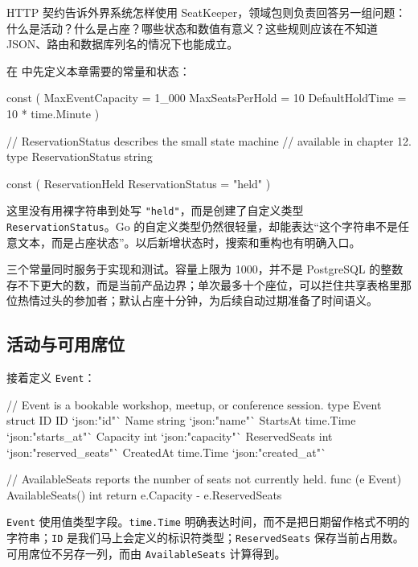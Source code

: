 HTTP 契约告诉外界系统怎样使用 SeatKeeper，领域包则负责回答另一组问题：什么是活动？什么是占座？哪些状态和数值有意义？这些规则应该在不知道 JSON、路由和数据库列名的情况下也能成立。

在  中先定义本章需要的常量和状态：

\begin{gocode}[title={代码清单 12.6 \texttt{domain.go}：常量与占座状态}]
const (
    MaxEventCapacity = 1_000
    MaxSeatsPerHold  = 10
    DefaultHoldTime  = 10 * time.Minute
)

// ReservationStatus describes the small state machine
// available in chapter 12.
type ReservationStatus string

const (
    ReservationHeld ReservationStatus = "held"
)
\end{gocode}

这里没有用裸字符串到处写 \texttt{"held"}，而是创建了自定义类型 \texttt{ReservationStatus}。Go 的自定义类型仍然很轻量，却能表达“这个字符串不是任意文本，而是占座状态”。以后新增状态时，搜索和重构也有明确入口。

三个常量同时服务于实现和测试。容量上限为 1000，并不是 PostgreSQL 的整数存不下更大的数，而是当前产品边界；单次最多十个座位，可以拦住共享表格里那位热情过头的参加者；默认占座十分钟，为后续自动过期准备了时间语义。

\subsection{活动与可用席位}

接着定义 \texttt{Event}：

\begin{gocode}[title={代码清单 12.7 \texttt{domain.go}：活动实体}]
// Event is a bookable workshop, meetup, or conference session.
type Event struct {
    ID            ID        `json:"id"`
    Name          string    `json:"name"`
    StartsAt      time.Time `json:"starts_at"`
    Capacity      int       `json:"capacity"`
    ReservedSeats int       `json:"reserved_seats"`
    CreatedAt     time.Time `json:"created_at"`
}

// AvailableSeats reports the number of seats not currently held.
func (e Event) AvailableSeats() int {
    return e.Capacity - e.ReservedSeats
}
\end{gocode}

\texttt{Event} 使用值类型字段。\texttt{time.Time} 明确表达时间，而不是把日期留作格式不明的字符串；\texttt{ID} 是我们马上会定义的标识符类型；\texttt{ReservedSeats} 保存当前占用数。可用席位不另存一列，而由 \texttt{AvailableSeats} 计算得到。

